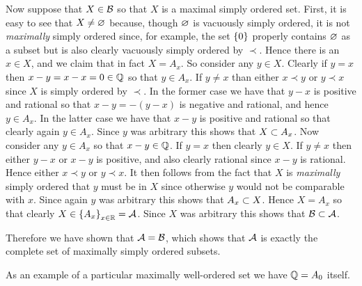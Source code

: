 {{    Now suppose that $X \in \cB$ so that $X$ is a maximal simply ordered set.
    First, it is easy to see that $X \neq \es$ because, though $\es$ is vacuously simply ordered, it is not \emph{maximally} simply ordered since, for example, the set $\braces{0}$ properly contains $\es$ as a subset but is also clearly vacuously simply ordered by $\prec$.
    Hence there is an $x \in X$, and we claim that in fact $X = A_x$.
    So consider any $y \in X$.
    Clearly if $y = x$ then $x-y = x-x = 0 \in \rats$ so that $y \in A_x$.
    If $y \neq x$ than either $x \prec y$ or $y \prec x$ since $X$ is simply ordered by $\prec$.
    In the former case we have that $y-x$ is positive and rational so that $x-y = -(y-x)$ is negative and rational, and hence $y \in A_x$.
    In the latter case we have that $x-y$ is positive and rational so that clearly again $y \in A_x$.
    Since $y$ was arbitrary this shows that $X \ss A_x$.
    Now consider any $y \in A_x$ so that $x-y \in \rats$.
    If $y = x$ then clearly $y \in X$.
    If $y \neq x$ then either $y-x$ or $x-y$ is positive, and also clearly rational since $x-y$ is rational.
    Hence either $x \prec y$ or $y \prec x$.
    It then follows from the fact that $X$ is \emph{maximally} simply ordered that $y$ must be in $X$ since otherwise $y$ would not be comparable with $x$.
    Since again $y$ was arbitrary this shows that $A_x \ss X$.
    Hence $X = A_x$ so that clearly $X \in \braces{A_x}_{x \in \reals} = \cA$.
    Since $X$ was arbitrary this shows that $\cB \ss \cA$.

    Therefore we have shown that $\cA = \cB$, which shows that $\cA$ is exactly the complete set of maximally simply ordered subsets.
  }

  As an example of a particular maximally well-ordered set we have $\rats = A_0$ itself.
}

